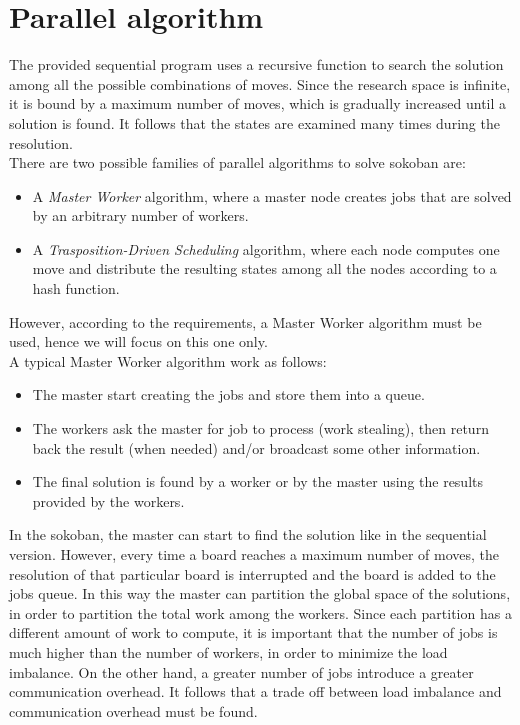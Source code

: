 \documentclass{article}
\begin{document}
\section{Parallel algorithm}
The provided sequential program uses a recursive function to search the solution among all the possible combinations of moves. Since the research space is infinite, it is bound by a maximum number of moves, which is gradually increased until a solution is found. It follows that the states are examined many times during the resolution. \\
There are two possible families of parallel algorithms to solve sokoban are:
\begin{itemize}
    \item A \textit{Master Worker} algorithm, where a master node creates jobs that are solved by an arbitrary number of workers.
    \item A \textit{Trasposition-Driven Scheduling} algorithm, where each node computes one move and distribute the resulting states among all the nodes according to a hash function.
\end{itemize}
However, according to the requirements, a Master Worker algorithm must be used, hence we will focus on this one only. \\
A typical Master Worker algorithm work as follows:
\begin{itemize}
    \item The master start creating the jobs and store them into a queue.
    \item The workers ask the master for job to process (work stealing), then return back the result (when needed) and/or broadcast some other information.
    \item The final solution is found by a worker or by the master using the results provided by the workers.
\end{itemize}
In the sokoban, the master can start to find the solution like in the sequential version. However, every time a board reaches a maximum number of moves, the resolution of that particular board is interrupted and the board is added to the jobs queue. In this way the master can partition the global space of the solutions, in order to partition the total work among the workers. Since each partition has a different amount of work to compute, it is important that the number of jobs is much higher than the number of workers, in order to minimize the load imbalance. On the other hand, a greater number of jobs introduce a greater communication overhead. It follows that a trade off between load imbalance and communication overhead must be found. \\
\end{document}
